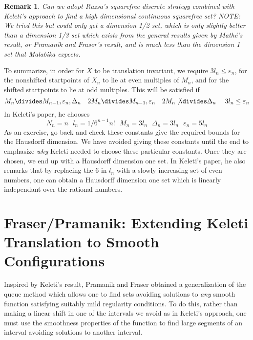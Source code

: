 \documentclass{report}
\theoremstyle{plain}
\theoremstyle{plain}
\newtheorem*{remark}{Remark}
\begin{document}
\begin{remark}
    Can we adopt Ruzsa's squarefree discrete strategy combined with Keleti's approach to find a high dimensional continuous squarefree set? NOTE: We tried this but could only get a dimension 1/2 set, which is only slightly better than a dimension 1/3 set which exists from the general results given by Math\'{e}'s result, or Pramanik and Fraser's result, and is much less than the dimension 1 set that Malabika expects.
\end{remark}

To summarize, in order for $X$ to be translation invariant, we require $3l_n \leq \varepsilon_n$, for the nonshifted startpoints of $X_n$ to lie at even multiples of $M_n$, and for the shifted startpoints to lie at odd multiples. This will be satisfied if
%
\[ M_n \divides M_{n-1}, \varepsilon_n, \Delta_n\ \ \ 2M_n \divides M_{n-1}, \varepsilon_n\ \ \ 2M_n \not \divides \Delta_n\ \ \ \ 3l_n \leq \varepsilon_n \]
%
In Keleti's paper, he chooses
%
\[ N_n = n\ \ \ l_n = 1/6^{n-1}n!\ \ \ M_n = 3l_n\ \ \ \Delta_n = 3l_n\ \ \ \varepsilon_n = 5l_n \]
%
As an exercise, go back and check these constants give the required bounds for the Hausdorff dimension. We have avoided giving these constants until the end to emphasize {\it why} Keleti needed to choose these particular constants. Once they are chosen, we end up with a Hausdorff dimension one set. In Keleti's paper, he also remarks that by replacing the 6 in $l_n$ with a slowly increasing set of even numbers, one can obtain a Hausdorff dimension one set which is linearly independant over the rational numbers.









\section{Fraser/Pramanik: Extending Keleti Translation to Smooth Configurations}

Inspired by Keleti's result, Pramanik and Fraser obtained a generalization of the queue method which allows one to find sets avoiding solutions to {\it any} smooth function satisfying suitably mild regularity conditions. To do this, rather than making a linear shift in one of the intervals we avoid as in Keleti's approach, one must use the smoothness properties of the function to find large segments of an interval avoiding solutions to another interval.
\end{document}
